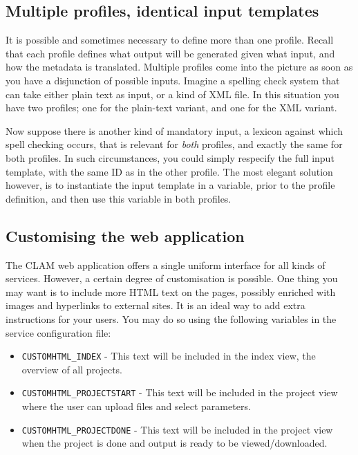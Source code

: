 \documentclass[a4paper,12pt,twoside,openright]{report}
\begin{document}
\subsection{Multiple profiles, identical input templates}

It is possible and sometimes necessary to define more than one profile. Recall
that each profile defines what output will be generated given what input, and
how the metadata is translated. Multiple profiles come into the picture as soon
as you have a disjunction of possible inputs. Imagine a spelling check system
that can take either plain text as input, or a kind of XML file. In this
situation you have two profiles; one for the plain-text variant, and one for
the XML variant. 

Now suppose there is another kind of mandatory input, a lexicon against which
spell checking occurs, that is relevant for \emph{both} profiles, and exactly
the same for both profiles. In such circumstances, you could simply respecify
the full input template, with the same ID as in the other profile. The most
elegant solution however, is to instantiate the input template in a variable,
prior to the profile definition, and then use this variable in both profiles.


\subsection{Customising the web application}

The CLAM web application offers a single uniform interface for all kinds of
services. However, a certain degree of customisation is possible. One thing you
may want is to include more HTML text on the pages, possibly enriched with
images and hyperlinks to external sites. It is an ideal way to add extra
instructions for your users. You may do so using the following variables in the
service configuration file:


\begin{itemize}
\item \texttt{CUSTOMHTML\_INDEX} - This text will be included in the index view, the overview of all projects.
\item \texttt{CUSTOMHTML\_PROJECTSTART} - This text will be included in the project view where the user can upload files and select parameters.
\item \texttt{CUSTOMHTML\_PROJECTDONE} - This text will be included in the project view when the project is done and output is ready to be viewed/downloaded.
\end{itemize}
\end{document}
